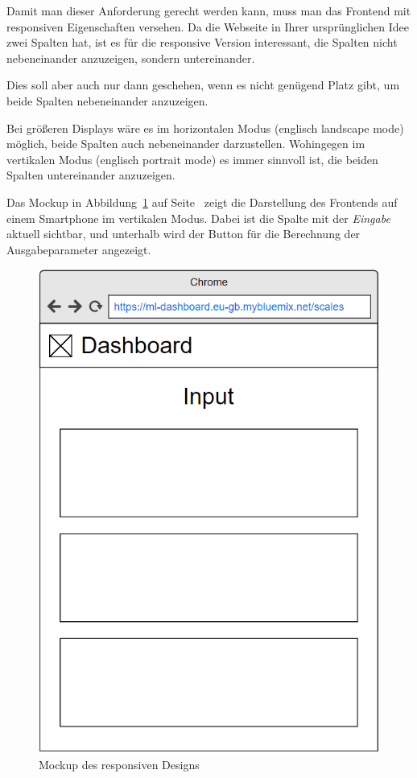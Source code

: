 Damit man dieser Anforderung gerecht werden kann, muss man das Frontend mit responsiven Eigenschaften versehen. Da die
Webseite in Ihrer ursprünglichen Idee zwei Spalten hat, ist es für die responsive Version interessant, die Spalten nicht
nebeneinander anzuzeigen, sondern untereinander.

Dies soll aber auch nur dann geschehen, wenn es nicht genügend Platz gibt, um beide Spalten nebeneinander anzuzeigen.

Bei größeren Displays wäre es im horizontalen Modus (englisch landscape mode) möglich, beide Spalten auch nebeneinander
darzustellen. Wohingegen im vertikalen Modus (englisch portrait mode) es immer sinnvoll ist, die beiden Spalten
untereinander anzuzeigen.

Das Mockup in Abbildung~\ref{fig:umsetzung_mockup_scale_responsive} auf
Seite~\pageref{fig:umsetzung_mockup_scale_responsive} zeigt die Darstellung des Frontends auf einem Smartphone im
vertikalen Modus. Dabei ist die Spalte mit der \textit{Eingabe} aktuell sichtbar, und unterhalb wird der Button für die
Berechnung der Ausgabeparameter angezeigt.

\begin{figure}[h]
    \centering
    \includegraphics[scale=0.45]{images/kapitel_4/mockup_scale_responsive.png}
    \caption{Mockup des responsiven Designs}
    \label{fig:umsetzung_mockup_scale_responsive}
\end{figure}

